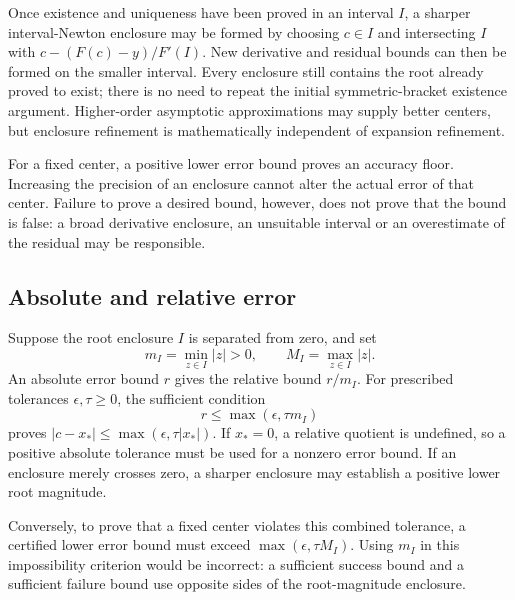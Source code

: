 Once existence and uniqueness have been proved in an interval $I$, a
sharper interval-Newton enclosure may be formed by choosing $c\in I$ and
intersecting $I$ with $c-(F(c)-y)/F'(I)$. New derivative and residual
bounds can then be formed on the smaller interval. Every enclosure still
contains the root already proved to exist; there is no need to repeat the
initial symmetric-bracket existence argument. Higher-order asymptotic
approximations may supply better centers, but enclosure refinement is
mathematically independent of expansion refinement.

For a fixed center, a positive lower error bound proves an accuracy
floor. Increasing the precision of an enclosure cannot alter the actual
error of that center. Failure to prove a desired bound, however, does not
prove that the bound is false: a broad derivative enclosure, an unsuitable
interval or an overestimate of the residual may be responsible.

\subsection{Absolute and relative error}

Suppose the root enclosure $I$ is separated from zero, and set
\[
 m_I=\min_{z\in I}|z|>0,\qquad M_I=\max_{z\in I}|z|.
\]
An absolute error bound $r$ gives the relative bound $r/m_I$.
For prescribed tolerances $\epsilon,\tau\ge0$, the sufficient condition
\[
 r\le\max(\epsilon,\tau m_I)
\]
proves $|c-x_*|\le\max(\epsilon,\tau|x_*|)$.
If $x_*=0$, a relative quotient is undefined, so a positive absolute
tolerance must be used for a nonzero error bound. If an enclosure merely
crosses zero, a sharper enclosure may establish a positive lower root
magnitude.

Conversely, to prove that a fixed center violates this combined tolerance,
a certified lower error bound must exceed $\max(\epsilon,\tau M_I)$.
Using $m_I$ in this impossibility criterion would be incorrect: a
sufficient success bound and a sufficient failure bound use opposite
sides of the root-magnitude enclosure.
